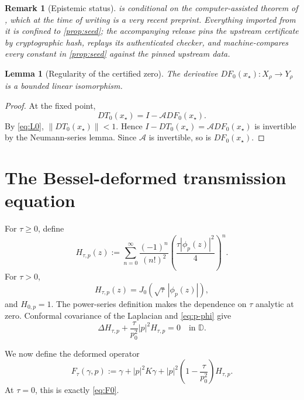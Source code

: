 \documentclass[11pt]{amsart}
\newtheorem{lemma}[theorem]{Lemma}
\newtheorem{remark}[theorem]{Remark}
\newcommand{\D}{\mathbb D}
\newcommand{\norm}[1]{\left\lVert #1\right\rVert}
\newcommand{\abs}[1]{\left\lvert #1\right\rvert}
\begin{document}
\begin{remark}[Epistemic status]\label{rem:conditional}
 is conditional on the computer-assisted theorem of
\cite{ColbrookStepaniants2026}, which at the time of writing is a very
recent preprint.  Everything imported from it is confined to
\cref{prop:seed}; the accompanying release pins the upstream certificate by
cryptographic hash, replays its authenticated checker, and machine-compares
every constant in \cref{prop:seed} against the pinned upstream data.
\end{remark}

\begin{lemma}[Regularity of the certified zero]\label{lem:regular}
The derivative $DF_0(x_\star):X_\rho\to Y_\rho$ is a bounded linear
isomorphism.
\end{lemma}

\begin{proof}
At the fixed point,
\[
  DT_0(x_\star)=I-\mathcal ADF_0(x_\star).
\]
By \eqref{eq:L0}, $\norm{DT_0(x_\star)}<1$.  Hence
$I-DT_0(x_\star)=\mathcal ADF_0(x_\star)$ is invertible by the
Neumann-series lemma.  Since $\mathcal A$ is invertible, so is
$DF_0(x_\star)$.
\end{proof}

\section{The Bessel-deformed transmission equation}\label{sec:deformation}

For $\tau\ge0$, define
\begin{equation}\label{eq:H}
  H_{\tau,p}(z)
  :=\sum_{n=0}^{\infty}
  \frac{(-1)^n}{(n!)^2}
  \left(\frac{\tau\abs{\phi_p(z)}^2}{4}\right)^n.
\end{equation}
For $\tau>0$,
\begin{equation}\label{eq:HJ0}
  H_{\tau,p}(z)=J_0\!\left(\sqrt\tau\,\abs{\phi_p(z)}\right),
\end{equation}
and $H_{0,p}=1$.  The power-series definition makes the dependence on
$\tau$ analytic at zero.  Conformal covariance of the Laplacian and
\eqref{eq:p-phi} give
\begin{equation}\label{eq:Hpde}
  \Delta H_{\tau,p}
  +\frac{\tau}{p_0^2}\abs p^2H_{\tau,p}=0
  \quad\text{in }\D.
\end{equation}

We now define the deformed operator
\begin{equation}\label{eq:Ftau}
  F_\tau(\gamma,p)
  :=\gamma+\abs p^2K\gamma
   +\abs p^2\left(1-\frac\tau{p_0^2}\right)H_{\tau,p}.
\end{equation}
At $\tau=0$, this is exactly \eqref{eq:F0}.
\end{document}
